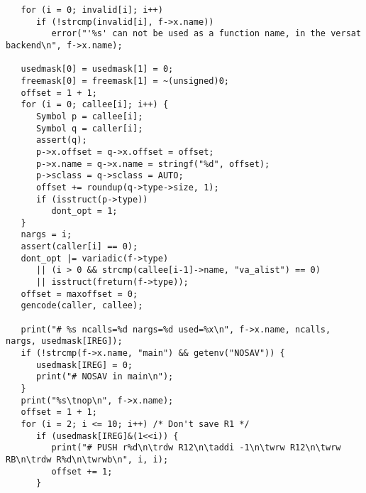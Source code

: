 {\begin{verbatim}
   for (i = 0; invalid[i]; i++)
      if (!strcmp(invalid[i], f->x.name))
         error("'%s' can not be used as a function name, in the versat backend\n", f->x.name);

   usedmask[0] = usedmask[1] = 0;
   freemask[0] = freemask[1] = ~(unsigned)0;
   offset = 1 + 1;
   for (i = 0; callee[i]; i++) {
      Symbol p = callee[i];
      Symbol q = caller[i];
      assert(q);
      p->x.offset = q->x.offset = offset;
      p->x.name = q->x.name = stringf("%d", offset);
      p->sclass = q->sclass = AUTO;
      offset += roundup(q->type->size, 1);
      if (isstruct(p->type))
         dont_opt = 1;
   }
   nargs = i;
   assert(caller[i] == 0);
   dont_opt |= variadic(f->type)
      || (i > 0 && strcmp(callee[i-1]->name, "va_alist") == 0)
      || isstruct(freturn(f->type));
   offset = maxoffset = 0;
   gencode(caller, callee);

   print("# %s ncalls=%d nargs=%d used=%x\n", f->x.name, ncalls, nargs, usedmask[IREG]);
   if (!strcmp(f->x.name, "main") && getenv("NOSAV")) {
      usedmask[IREG] = 0;
      print("# NOSAV in main\n");
   }
   print("%s\tnop\n", f->x.name);
   offset = 1 + 1;
   for (i = 2; i <= 10; i++) /* Don't save R1 */
      if (usedmask[IREG]&(1<<i)) {
         print("# PUSH r%d\n\trdw R12\n\taddi -1\n\twrw R12\n\twrw RB\n\trdw R%d\n\twrwb\n", i, i);
         offset += 1;
      }


\end{verbatim}}
